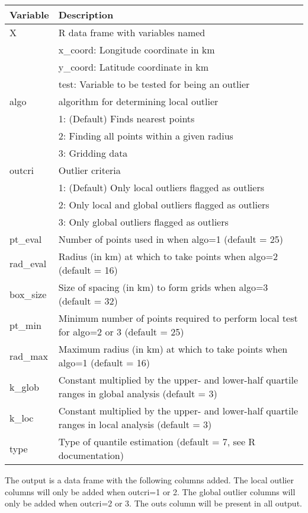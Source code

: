 \documentclass[12pt,a4paper]{article}
\begin{document}
\begin{table}[H]
\begin{tabular} {p{2cm} p{11cm}}
\hline
\textbf{Variable} & \textbf{Description}\\
\hline
\textsf{X} 			 & R data frame with variables named \\
 & \textsf{x\_coord}: Longitude coordinate in km\\
 & \textsf{y\_coord}: Latitude coordinate in km\\
 & \textsf{test}: Variable to be tested for being an outlier\\
\textsf{algo} & algorithm for determining local outlier\\
 & 1: (Default) Finds nearest points\\
 & 2: Finding all points within a given radius\\
 & 3: Gridding data\\
\textsf{outcri} & Outlier criteria\\
 & 1: (Default) Only local outliers flagged as outliers\\
 & 2: Only local and global outliers flagged as outliers\\
 & 3: Only global outliers flagged as outliers\\
\textsf{pt\_eval} & Number of points used in when \textsf{algo}=1 (default = 25)\\
\textsf{rad\_eval} & Radius (in km) at which to take points when \textsf{algo}=2 (default = 16)\\
\textsf{box\_size} & Size of spacing (in km) to form grids when \textsf{algo}=3 (default = 32)\\
\textsf{pt\_min} & Minimum number of points required to perform local test for \textsf{algo}=2 or 3 (default = 25)\\
\textsf{rad\_max} & Maximum radius (in km) at which to take points when \textsf{algo}=1 (default = 16)\\
\textsf{k\_glob} & Constant multiplied by the upper- and lower-half quartile ranges in global analysis (default = 3)\\
\textsf{k\_loc} & Constant multiplied by the upper- and lower-half quartile ranges in local analysis (default = 3)\\
\textsf{type}	 & Type of quantile estimation (default = 7, see R documentation)\\
\hline
\end{tabular} 
\end{table}

The output is a data frame with the following columns added. The local outlier columns will only be added when \textsf{outcri}=1 or 2. The global outlier columns will only be added when \textsf{outcri}=2 or 3. The \textsf{outs} column will be present in all output.
\end{document}
